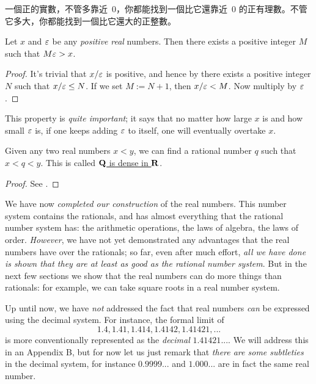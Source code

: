 \begin{note}
一個正的實數，不管多靠近\ 0，你都能找到一個比它還靠近\ 0 的正有理數。不管它多大，你都能找到一個比它還大的正整數。
\end{note}

\begin{corollary}  \label{corollary 5.4.13} 
Let \(x\) and \(\varepsilon\) be any \emph{positive} \emph{real} numbers.
Then there exists a positive integer \(M\) such that \(M\varepsilon > x\).
\end{corollary}

\begin{proof}
It's trivial that \(x/\varepsilon\) is positive, and hence by  there exists a positive integer \(N\) such that \(x/\varepsilon \le N\).
If we set \(M := N + 1\), then \(x/\varepsilon < M\).
Now multiply by \(\varepsilon\).
\end{proof}

\begin{note}
This property is \emph{quite important};
it says that no matter how large \(x\) is and how small \(\varepsilon\) is, if one keeps adding \(\varepsilon\) to itself, one will eventually
overtake \(x\).
\end{note}

\begin{proposition} \label{prop 5.4.14}
Given any two real numbers \(x < y\), we can find a rational number \(q\) such that \(x < q < y\).
This is called \href{https://www.youtube.com/watch?v=A9L6YVtoAsQ}{\(\mathbf{Q}\) is dense in \(\mathbf{R}\)}.
\end{proposition}

\begin{proof}
See .
\end{proof}

We have now \emph{completed our construction} of the real numbers.
This number system contains the rationals, and has almost everything that the rational number system has: the arithmetic operations, the laws of algebra, the laws of order.
\emph{However}, we have not yet demonstrated any advantages that the real numbers have over the rationals;
so far, even after much effort, \emph{all we have done is shown that they are at least as good as the rational number system}.
But in the next few sections we show that the real numbers can do more things than rationals:
for example, we can take square roots in a real number system.

\begin{remark} \label{remark 5.4.15}
Up until now, we have \emph{not} addressed the fact that real numbers \emph{can} be expressed using the decimal system.
For instance, the formal limit of
\[
    1.4, 1.41, 1.414, 1.4142, 1.41421,...
\]
is more conventionally represented as the \emph{decimal} \(1.41421 ...\).
We will address this in an Appendix B, but for now let us just remark that \emph{there are some subtleties} in the decimal system,
for instance \(0.9999...\) and \(1.000...\) are in fact the same real number.
\end{remark}

